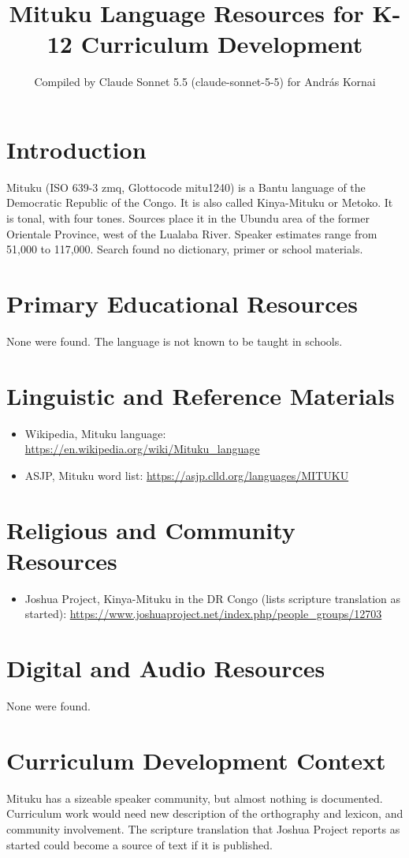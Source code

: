 \documentclass[12pt]{article}
\title{Mituku Language Resources for K-12 Curriculum Development}
\author{Compiled by Claude Sonnet 5.5 (claude-sonnet-5-5) for Andr\'as Kornai}
\date{}
\begin{document}
\maketitle

\section{Introduction}
Mituku (ISO 639-3 zmq, Glottocode mitu1240) is a Bantu language of the Democratic Republic of the Congo. It is also called Kinya-Mituku or Metoko. It is tonal, with four tones. Sources place it in the Ubundu area of the former Orientale Province, west of the Lualaba River. Speaker estimates range from 51,000 to 117,000. Search found no dictionary, primer or school materials.

\section{Primary Educational Resources}
None were found. The language is not known to be taught in schools.

\section{Linguistic and Reference Materials}
\begin{itemize}
\item Wikipedia, Mituku language: \url{https://en.wikipedia.org/wiki/Mituku_language}
\item ASJP, Mituku word list: \url{https://asjp.clld.org/languages/MITUKU}
\end{itemize}

\section{Religious and Community Resources}
\begin{itemize}
\item Joshua Project, Kinya-Mituku in the DR Congo (lists scripture translation as started): \url{https://www.joshuaproject.net/index.php/people_groups/12703}
\end{itemize}

\section{Digital and Audio Resources}
None were found.

\section{Curriculum Development Context}
Mituku has a sizeable speaker community, but almost nothing is documented. Curriculum work would need new description of the orthography and lexicon, and community involvement. The scripture translation that Joshua Project reports as started could become a source of text if it is published.
\end{document}

